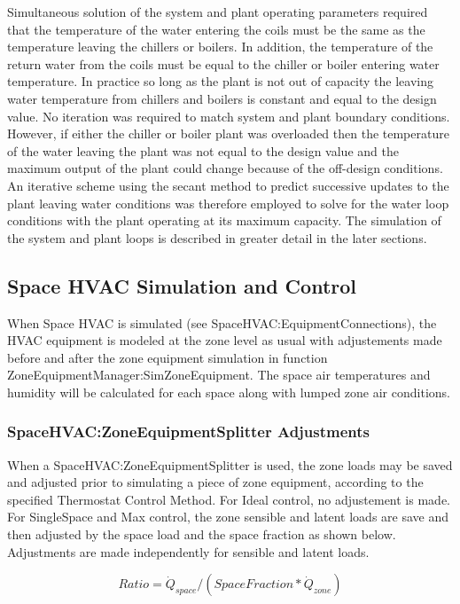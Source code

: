 Simultaneous solution of the system and plant operating parameters required that the temperature of the water entering the coils must be the same as the temperature leaving the chillers or boilers. In addition, the temperature of the return water from the coils must be equal to the chiller or boiler entering water temperature. In practice so long as the plant is not out of capacity the leaving water temperature from chillers and boilers is constant and equal to the design value. No iteration was required to match system and plant boundary conditions. However, if either the chiller or boiler plant was overloaded then the temperature of the water leaving the plant was not equal to the design value and the maximum output of the plant could change because of the off-design conditions. An iterative scheme using the secant method to predict successive updates to the plant leaving water conditions was therefore employed to solve for the water loop conditions with the plant operating at its maximum capacity. The simulation of the system and plant loops is described in greater detail in the later sections.

\subsection{Space HVAC Simulation and Control}\label{space-hvac-simulation-and-control}
When Space HVAC is simulated (see SpaceHVAC:EquipmentConnections), the HVAC equipment is modeled at the zone level as usual with adjustements made before and after the zone equipment simulation in function ZoneEquipmentManager:SimZoneEquipment. The space air temperatures and humidity will be calculated for each space along with lumped zone air conditions.

\subsubsection{SpaceHVAC:ZoneEquipmentSplitter Adjustments}\label{space-hvac-zoneeqsplitter-adjustments}
When a SpaceHVAC:ZoneEquipmentSplitter is used, the zone loads may be saved and adjusted prior to simulating a piece of zone equipment, according to the specified Thermostat Control Method. For Ideal control, no adjustement is made. For SingleSpace and Max control, the zone sensible and latent loads are save and then adjusted by the space load and the space fraction as shown below. Adjustments are made independently for sensible and latent loads.

\begin{equation}
{Ratio} = \dot Q_{space} / (SpaceFraction * {\dot Q_{zone}})
\label{eq:SpaceHVACLoadAdjustment1}
\end{equation}

